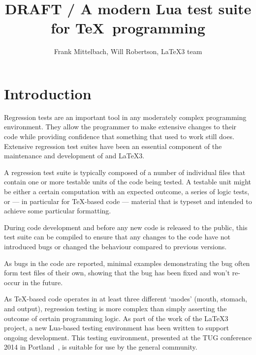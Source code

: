 \documentclass[a4paper]{ltugboat}
\begin{document}
\title{DRAFT / A modern Lua test suite for \TeX\ programming}
\author{Frank Mittelbach, Will Robertson, \LaTeX3 team}
\address{%
  Mainz,  Germany\\
  Adelaide, Australia}



\newcommand\drivername{build.lua}
\newcommand\makename{l3build.lua}
\newcommand\execname{texlua \drivername}
\newcommand\compdirname{test/}

\setcounter{page}{777}

\newcommand\pdfTeX{pdf\TeX}
\newcommand\luaTeX{Lua\TeX}

\maketitle

\tableofcontents

\section{Introduction}

Regression tests are an important tool in any moderately complex
programming environment.  They allow the programmer to make extensive
changes to their code while providing confidence that something that
used to work still does.  Extensive regression test suites have been
an essential component of the maintenance and development of \LaTeXe{}
and \LaTeX3.

A regression test suite is typically composed of a number of
individual files that contain one or more testable units of the code
being tested. A testable unit might be either a certain computation
with an expected outcome, a series of logic tests, or --- in
particular for \TeX{}-based code --- material that is typeset and
intended to achieve some particular formatting.

During code development and before any new code is released to the
public, this test suite can be compiled to ensure that any changes to
the code have not introduced bugs or changed the behaviour compared to
previous versions.

As bugs in the code are reported, minimal examples demonstrating the
bug often form test files of their own, showing that the bug has been
fixed and won't re-occur in the future.

As \TeX{}-based code operates in at least three different `modes'
(mouth, stomach, and output), regression testing is more complex than
simply asserting the outcome of certain programming logic.  As part of
the work of the \LaTeX3 project, a new Lua-based testing environment
has been written to support ongoing development.  This testing
environment, presented at the TUG conference 2014 in
Portland~\cite{Mittelbach:l3buildtalk}, is suitable for use by the
general community.
\end{document}
